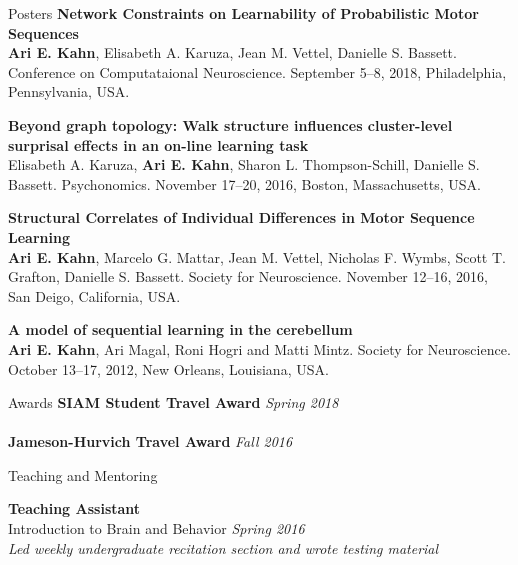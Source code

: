 \documentclass{resume} %
\begin{document}
\begin{rSection}{Posters}
\textbf{Network Constraints on Learnability of Probabilistic Motor Sequences} \\
\textbf{Ari E. Kahn}, Elisabeth A. Karuza, Jean M. Vettel, Danielle S. Bassett.
Conference on Computataional Neuroscience. September 5--8, 2018, Philadelphia, Pennsylvania, USA.

\textbf{Beyond graph topology: Walk structure influences cluster-level surprisal effects in an on-line learning task} \\
Elisabeth A. Karuza, \textbf{Ari E. Kahn}, Sharon L. Thompson-Schill, Danielle S. Bassett.
Psychonomics. November 17--20, 2016, Boston, Massachusetts, USA.

\textbf{Structural Correlates of Individual Differences in Motor Sequence Learning} \\
\textbf{Ari E. Kahn}, Marcelo G. Mattar, Jean M. Vettel, Nicholas F. Wymbs, Scott T. Grafton, Danielle S. Bassett.
Society for Neuroscience. November 12--16, 2016, San Deigo, California, USA.

\textbf{A model of sequential learning in the cerebellum} \\
\textbf{Ari E. Kahn}, Ari Magal, Roni Hogri and Matti Mintz.
Society for Neuroscience. October 13--17, 2012, New Orleans, Louisiana, USA.
\end{rSection}

\begin{rSection}{Awards}
    \textbf{SIAM Student Travel Award} \hfill \emph{Spring 2018} \\
    \\
    \textbf{Jameson-Hurvich Travel Award} \hfill \emph{Fall 2016} \\
\end{rSection}


\begin{rSection}{Teaching and Mentoring}

\textbf{Teaching Assistant} \\
Introduction to Brain and Behavior \hfill \emph{Spring 2016} \\
\emph{Led weekly undergraduate recitation section and wrote testing material}
\end{rSection}
\end{document}

